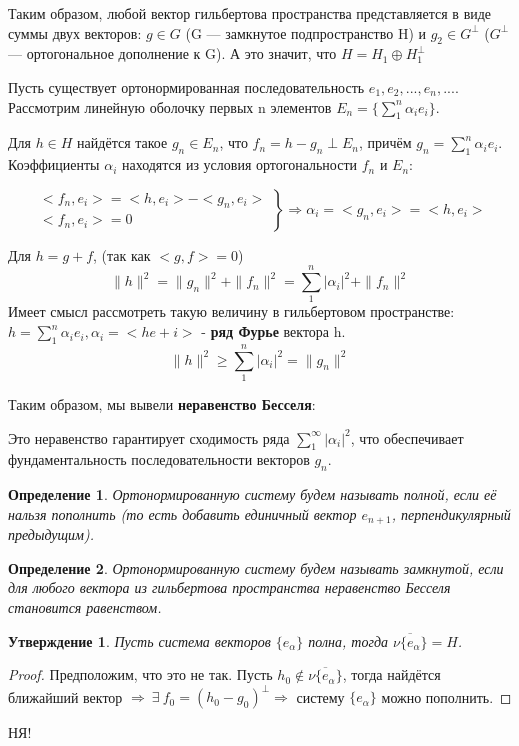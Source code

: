 \documentclass[12pt]{article}
\let\existstemp\exists
\renewcommand{\exists}{\: \existstemp \:}
\newcommand{\norm}[1]{\| #1 \|}
\renewcommand{\geq}{\geqslant}
\newtheorem{defi}{Определение}[section]
\newtheorem{state}{Утверждение}[section] %
\begin{document}
	Таким образом, любой вектор гильбертова пространства представляется в виде суммы двух векторов:
	$g \in G$ (G --- замкнутое подпространство H) и $g_2 \in G^\perp$ ($G^\perp$ --- ортогональное дополнение к G).
	А это значит, что $H = H_1 \oplus H_1^\perp$
	
	Пусть существует ортонормированная последовательность $e_1, e_2, ..., e_n, ...$. Рассмотрим линейную оболочку первых n элементов $E_n = \{ \sum_1^n \alpha_i e_i \}$.

	Для $h \in H$ найдётся такое $g_n \in E_n$, что $f_n = h - g_n \perp E_n$, причём $g_n = \sum_1^n \alpha_i e_i$. Коэффициенты $\alpha_i$ находятся из условия ортогональности $f_n$ и $E_n$:

    $$
        \left.
        \begin{aligned}
            <f_n, e_i> = <h, e_i> - <g_n, e_i> \\
            <f_n, e_i> = 0
        \end{aligned}
        \right\} \Rightarrow \alpha_i = <g_n, e_i> = <h, e_i>
    $$

	Для $h = g + f$, (так как $<g,f> = 0$)
	$$ \norm{h}^2 = \norm{g_n}^2 + \norm{f_n}^2 = \sum_1^n |\alpha_i|^2 + \norm{f_n}^2$$
	Имеет смысл рассмотреть такую величину в гильбертовом пространстве: $h = \sum_1^n \alpha_i e_i, \alpha_i = <h e+i>$ -
	\textbf{ряд Фурье} вектора h.
	$$ \norm{h}^2 \geq \sum_1^n |\alpha_i|^2 = \norm{g_n}^2 $$

	
	Таким образом, мы вывели \textbf{неравенство Бесселя}:

	Это неравенство гарантирует сходимость ряда $\sum_1^{\infty} |\alpha_i|^2$, что обеспечивает фундаментальность 
	последовательности векторов $g_n$.
	
	\begin{defi}
		Ортонормированную систему будем называть полной, если её нальзя пополнить (то есть добавить единичный вектор $e_{n+1}$, 
		перпендикулярный предыдущим).
	\end{defi}
	\begin{defi}
		Ортонормированную систему будем называть замкнутой, если для любого вектора из гильбертова пространства неравенство Бесселя
		становится равенством.
	\end{defi}
	
	\begin{state}
		Пусть система векторов $\{ e_\alpha \}$ полна, тогда $\overline{ \nu \{ e_\alpha \} } = H$.
	\end{state}
	\begin{proof}
		Предположим, что это не так. Пусть $h_0 \notin \overline{ \nu \{ e_\alpha \} }$, тогда найдётся ближайший вектор $\Rightarrow 
		\exists f_0 	= (h_0 - g_0)^\perp	\Rightarrow$ систему $\{ e_{\alpha} \}$ можно пополнить.
	\end{proof}
	
	{\huge НЯ!}
\end{document}
